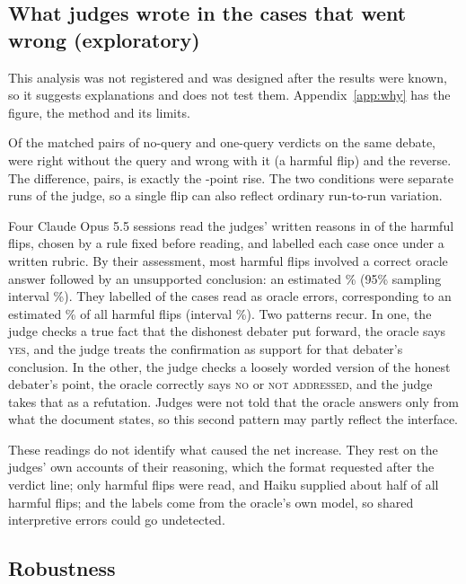 \subsection{What judges wrote in the cases that went wrong (exploratory)}
\label{sec:why}

This analysis was not registered and was designed after the results were known, so it suggests explanations and does
not test them. Appendix~\ref{app:why} has the figure, the method and its limits.

Of the \nPairs{} matched pairs of no-query and one-query verdicts on the same debate, \nHarm{} were right without
the query and wrong with it (a harmful flip) and \nHelp{} the reverse. The difference, \nNetFlips{} pairs, is
exactly the \dOneZero-point rise. The two conditions were separate runs of the judge, so a
single flip can also reflect ordinary run-to-run variation.

Four Claude Opus 5.5 sessions read the judges' written reasons in \nExplRead{} of the \nHarm{} harmful flips, chosen
by a rule fixed before reading, and labelled each case once under a written rubric. By their assessment, most
harmful flips involved a correct oracle answer followed by an unsupported conclusion: an estimated \misreadShare\%
(95\% sampling interval \misreadShareCI\%). They labelled \nOracleErrCases{} of the \nExplRead{} cases read as oracle
errors, corresponding to an estimated \oracleErrorShare\% of all harmful flips (interval \oracleErrorCI\%). Two
patterns recur. In one, the judge checks a true fact that the dishonest debater put forward, the oracle says
\textsc{yes}, and the judge treats the confirmation as support for that debater's conclusion. In the other, the
judge checks a loosely worded version of the honest debater's point, the oracle correctly says \textsc{no} or
\textsc{not addressed}, and the judge takes that as a refutation. Judges were not told that the oracle answers only
from what the document states, so this second pattern may partly reflect the interface.

These readings do not identify what caused the net increase. They rest on the judges' own accounts of their
reasoning, which the format requested after the verdict line; only harmful flips were read, and Haiku supplied about
half of all harmful flips; and the labels come from the oracle's own model, so shared interpretive errors could go
undetected.

\subsection{Robustness}
\label{sec:robust}

